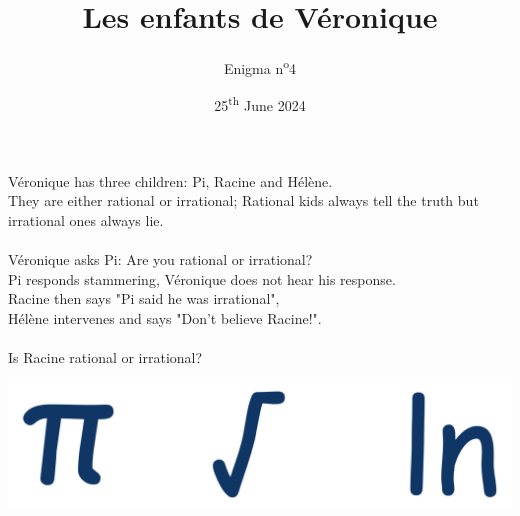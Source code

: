 \documentclass[a4paper, top=10mm]{article}
\title{\textbf{\huge{Les enfants de Véronique}}}
\author{Enigma n\textsuperscript{o}4}
\date{25\textsuperscript{th} June 2024}
\begin{document}
	\maketitle
	
	\Large
	Véronique has three children: Pi, Racine and Hélène.\\
	They are either rational or irrational; Rational kids always tell the truth but irrational ones always lie.\\
	\\
	Véronique asks Pi: Are you rational or irrational?\\
	Pi responds stammering, Véronique does not hear his response.\\
	Racine then says "Pi said he was irrational",\\
	Hélène intervenes and says "Don’t believe Racine!".\\
	\\
	Is Racine rational or irrational?
	
	\vspace{1cm}
	
	\begin{center}
		\includegraphics[width=\linewidth]{04symbols.pdf}
	\end{center}
	
	
\end{document}
